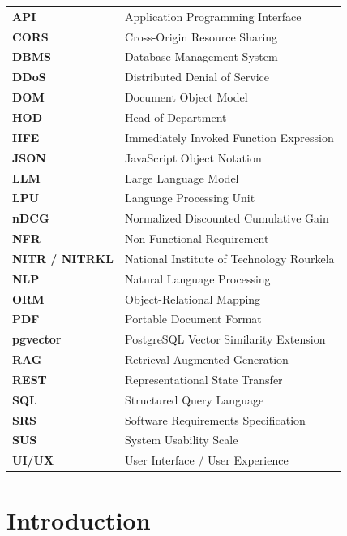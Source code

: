\documentclass[12pt,a4paper]{report}
\begin{document}
\begin{tabular}{ll}
\textbf{API} & Application Programming Interface\\
\textbf{CORS} & Cross-Origin Resource Sharing\\
\textbf{DBMS} & Database Management System\\
\textbf{DDoS} & Distributed Denial of Service\\
\textbf{DOM} & Document Object Model\\
\textbf{HOD} & Head of Department\\
\textbf{IIFE} & Immediately Invoked Function Expression\\
\textbf{JSON} & JavaScript Object Notation\\
\textbf{LLM} & Large Language Model\\
\textbf{LPU} & Language Processing Unit\\
\textbf{nDCG} & Normalized Discounted Cumulative Gain\\
\textbf{NFR} & Non-Functional Requirement\\
\textbf{NITR / NITRKL} & National Institute of Technology Rourkela\\
\textbf{NLP} & Natural Language Processing\\
\textbf{ORM} & Object-Relational Mapping\\
\textbf{PDF} & Portable Document Format\\
\textbf{pgvector} & PostgreSQL Vector Similarity Extension\\
\textbf{RAG} & Retrieval-Augmented Generation\\
\textbf{REST} & Representational State Transfer\\
\textbf{SQL} & Structured Query Language\\
\textbf{SRS} & Software Requirements Specification\\
\textbf{SUS} & System Usability Scale\\
\textbf{UI/UX} & User Interface / User Experience\\
\end{tabular}

\newpage
{}
\setcounter{page}{1}

\chapter{Introduction}
\end{document}
